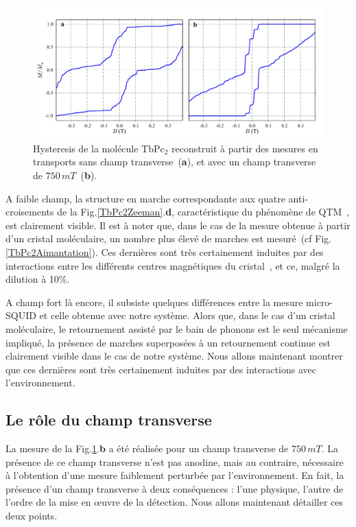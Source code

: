 \begin{figure}
\includegraphics[scale=0.45]{Resultats/CompCrisMolUnique/CompCrisMolUnique.pdf} 
\caption{Hysteresis de la molécule TbPc$_2$ reconstruit à partir des mesures en transports sans champ transverse~(\textbf{a}), et avec un champ transverse de $750\,mT$~(\textbf{b}).}
\label{CompAimant}
\end{figure}

A faible champ, la structure en marche correspondante aux quatre anti-croisements de la Fig.\ref{TbPc2Zeeman}.\textbf{d}, caractéristique du phénomène de QTM~\cite{Thomas1996,Friedman1996}, est clairement visible. Il est à noter que, dans le cas de la mesure obtenue à partir d'un cristal moléculaire, un nombre plus élevé de marches est mesuré~(cf Fig.\ref{TbPc2Aimantation}). Ces dernières sont très certainement induites par des interactions entre les différents centres magnétiques du cristal~\cite{Wernsdorfer2002}, et ce, malgré la dilution à 10\%.

A champ fort là encore, il subsiste quelques différences entre la mesure micro-SQUID et celle obtenue avec notre système. Alors que, dans le cas d'un cristal moléculaire, le retournement assisté par le bain de phonons est le seul mécanisme impliqué, la présence  de marches superposées à un retournement continue est clairement visible dans le cas de notre système. Nous allons maintenant montrer que ces dernières sont très certainement induites par des interactions avec l'environnement.


\subsection{Le r\^ole du champ transverse}

La mesure de la Fig.\ref{CompAimant}.\textbf{b} a été réalisée pour un champ transverse de $750\,mT$. La présence de ce champ transverse n'est pas anodine, mais au contraire, nécessaire à l'obtention d'une mesure faiblement perturbée par l'environnement. En fait, la présence d'un champ transverse à deux conséquences : l'une physique, l'autre de l'ordre de la mise en œuvre de la détection. Nous allons maintenant détailler ces deux points.

